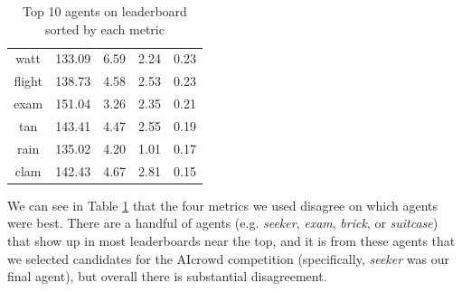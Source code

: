 \begin{table}[H]
{\begin{tabular}{|| c | c | c | c | c ||}
     watt &     133.09 &  6.59 &    2.24 &           0.23 \\
   flight &     138.73 &  4.58 &    2.53 &           0.23 \\
     exam &     151.04 &  3.26 &    2.35 &           0.21 \\
      tan &     143.41 &  4.47 &    2.55 &           0.19 \\
     rain &     135.02 &  4.20 &    1.01 &           0.17 \\
     clam &     142.43 &  4.67 &    2.81 &           0.15 \\[1ex] 
 \hline
\end{tabular}
}
\caption{Top 10 agents on leaderboard sorted by each metric}
\label{TableTopAgentsMetrics}
\end{table}

We can see in Table \ref{TableTopAgentsMetrics} that the four metrics we used disagree on which agents were best. There are a handful of agents (e.g. \textit{seeker}, \textit{exam}, \textit{brick}, or \textit{suitcase}) that show up in most leaderboards near the top, and it is from these agents that we selected candidates for the AIcrowd competition (specifically, \textit{seeker} was our final agent), but overall there is substantial disagreement.

